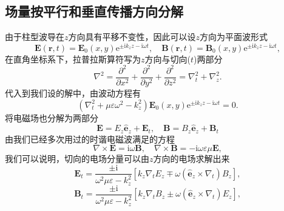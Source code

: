\documentclass[UTF8]{ctexbook}
\newcommand{\e}{\mathrm{e}}
\renewcommand{\b}{\boldsymbol}
\renewcommand{\i}{\mathrm{i}}
\numberwithin{equation}{chapter}
\begin{document}
	\subsection{场量按平行和垂直传播方向分解}
	由于柱型波导在$z$方向具有平移不变性，因此可以设$z$方向为平面波形式
	\[\b{E}(\b{r},t)=\b{E}_0(x,y)\e^{\pm\i k_zz-\i\omega t},\quad \b{B}(\b{r},t)=\b{B}_0(x,y)\e^{\pm\i k_zz-\i\omega t},\]
	在直角坐标系下，拉普拉斯算符写为$z$方向与切向($t$)两部分
	\[\nabla^2=\frac{\partial^2}{\partial x^2}+\frac{\partial^2}{\partial y^2}+\frac{\partial^2}{\partial z^2}=\nabla_t^2+\nabla_z^2.\]
	代入到我们设的解中，由波动方程有
	\[(\nabla_t^2+\mu\varepsilon\omega^2-k_z^2)\b{E}_0(x,y)\e^{\pm\i k_zz-\i\omega t}=0.\]
	将电磁场也分解为两部分
	\[\b{E}=E_z\hat{\b{e}}_z+\b{E}_t,\quad \b{B}=B_z\hat{\b{e}}_z+\b{B}_t\]
	由我们已经多次用过的时谐电磁波满足的方程
	\[\nabla\times\b{E}=\i\omega\b{B},\quad \nabla\times\b{B}=-\i\omega\varepsilon\mu\b{E},\]
	我们可以说明，切向的电场分量可以由$z$方向的电场求解出来
	\[\b{E}_t=\frac{\pm\i}{\omega^2\mu\varepsilon-k_z^2}\left[k_z\nabla_tE_z\mp\omega(\hat{\b{e}}_z\times\nabla_t)B_z\right],\]\label{*1}
	\[\b{B}_t=\frac{\pm\i}{\omega^2\mu\varepsilon-k_z^2}\left[k_z\nabla_tB_z\pm\omega(\hat{\b{e}}_z\times\nabla_t)E_z\right],\]\label{*2}
\end{document}
